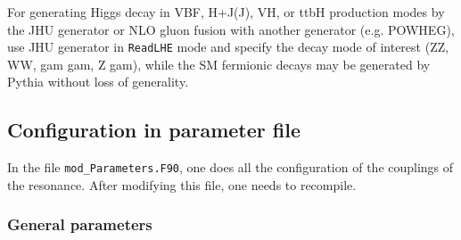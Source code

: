 \documentclass[aps,superscriptaddress,nofootinbib]{revtex4}
\begin{document}

\noindent
For generating Higgs decay in VBF, H+J(J), VH, or ttbH production
modes by the JHU generator or NLO gluon fusion with another generator (e.g. POWHEG), use JHU generator in \verb|ReadLHE|
mode and specify the decay mode of interest (ZZ, WW, gam gam, Z gam), while the SM fermionic decays
may be generated by Pythia without loss of generality.

\subsection{ Configuration in parameter file  }

In the file \verb|mod_Parameters.F90|, one does all the configuration of the couplings of the resonance.
After modifying this file, one needs to recompile.

\subsubsection{ General parameters }
\end{document}
